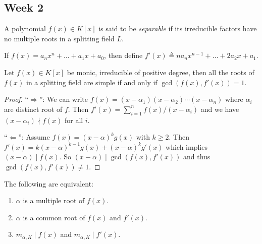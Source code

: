 \subsection{Week 2}

\begin{definition}
  A polynomial $f(x) \in K[x]$ is said to be \emph{separable}
  if its irreducible factors have no multiple roots in a splitting field $L$.
\end{definition}

\begin{definition}
  If $f(x) = a_n x^n + \ldots + a_1 x + a_0$, then define $f'(x) \triangleq n a_n x^{n-1} + \ldots + 2a_2 x + a_1$.
\end{definition}

\begin{theorem} \label{thm:multiple-root-condition}
  Let $f(x) \in K[x]$ be monic, irreducible of positive degree, then all the roots of $f(x)$
  in a splitting field are simple if and only if $\gcd(f(x), f'(x)) = 1$.

  \begin{proof}
    ``$\Rightarrow$'': We can write $f(x) = (x - \alpha_1) (x - \alpha_2) \cdots (x - \alpha_n)$ where
    $\alpha_i$ are distinct root of $f$. Then $f'(x) = \sum_{i = 1}^n f(x) / (x - \alpha_i)$
    and we have $(x - \alpha_i) \nmid f(x)$ for all $i$.

    ``$\Leftarrow$'': Assume $f(x) = (x - \alpha)^k g(x)$ with $k \geq 2$.
    Then $f'(x) = k (x - \alpha)^{k-1} g(x) + (x - \alpha)^k g'(x)$ which implies $(x - \alpha) \mid f(x)$.
    So $(x - \alpha) \mid \gcd(f(x), f'(x))$ and thus $\gcd(f(x), f'(x)) \neq 1$.
  \end{proof}
\end{theorem}

\begin{remark}
  The following are equivalent:
  \begin{enumerate}
    \item $\alpha$ is a multiple root of $f(x)$.
    \item $\alpha$ is a common root of $f(x)$ and $f'(x)$.
    \item $m_{\alpha, K} \mid f(x)$ and $m_{\alpha, K} \mid f'(x)$.
  \end{enumerate}
\end{remark}

